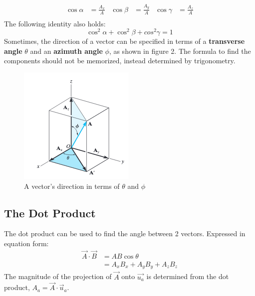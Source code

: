 \documentclass[12pt]{article}
\begin{document}
\begin{align*}
    \cos{\alpha} &= \frac{A_x}{A} & \cos{\beta} &= \frac{A_y}{A} & \cos{\gamma} &= \frac{A_z}{A} \\
\end{align*}
The following identity also holds:
\begin{equation*}
    \cos^2{\alpha} + \cos^2{\beta} + cos^2{\gamma} = 1
\end{equation*}
Sometimes, the direction of a vector can be specified in terms of a \textbf{transverse angle} $\theta$ and an \textbf{azimuth angle} $\phi$, as shown in figure 2.
The formula to find the components should not be memorized, instead determined by trigonometry.

\begin{figure}[h]
\centering
\includegraphics[scale=0.7]{transverse_azmuth.png}
\caption{A vector's direction in terms of $\theta$ and $\phi$ \cite{hibbeler}}
\end{figure}
\pagebreak

\subsection{The Dot Product}
The dot product can be used to find the angle between 2 vectors.
Expressed in equation form:
\begin{align*}
    \vec{A}\cdot\vec{B} &= AB\cos{\theta}\\
                        &= A_xB_x + A_yB_y + A_zB_z
\end{align*}
The magnitude of the projection of $\vec{A}$ onto $\vec{u_a}$ is determined from the dot product, $A_a = \vec{A}\cdot\vec{u}_a$.
\end{document}
